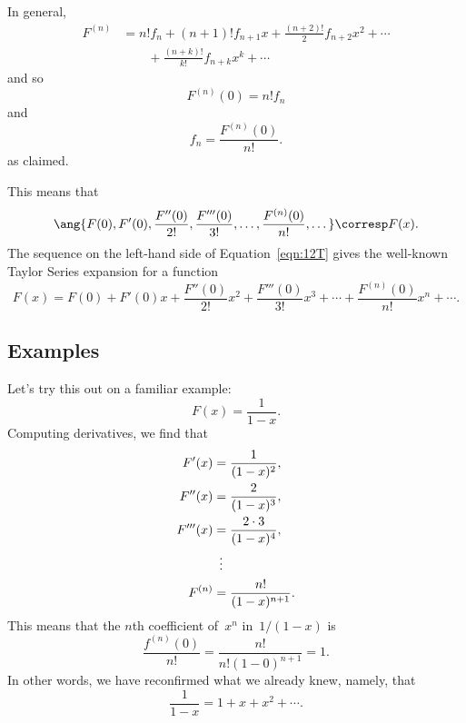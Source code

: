 In general,
\begin{align*}
F^{(n)}
    &= n! f_n
        + (n + 1)! f_{n + 1} x
        + \frac{(n + 2)!}{2} f_{n + 2} x^2
        + \cdots \\
    & \qquad {} + \frac{(n + k)!}{k!} f_{n + k} x^k
        + \cdots
\end{align*}
and so
\begin{equation*}
    F^{(n)}(0) = n! f_n
\end{equation*}
and
\begin{equation*}
    f_n = \frac{F^{(n)}(0)}{n!}.
\end{equation*}
as claimed.

This means that
\begin{equation}\label{eqn:12T}
\ang{ F(0), F'(0), \frac{F''(0)}{2!}, \frac{F'''(0)}{3!}, \dots, 
    \frac{F^{(n)}(0)}{n!}, \dots }
\corresp F(x).
\end{equation}
The sequence on the left-hand side of Equation~\ref{eqn:12T} gives the
well-known Taylor Series expansion for a function
\begin{equation*}
F(x) = F(0) + F'(0) x + \frac{F''(0)}{2!} x^2 +
    \frac{F'''(0)}{3!} x^3 + \cdots + 
    \frac{F^{(n)}(0)}{n!} x^n + \cdots.
\end{equation*}

\subsection{Examples}

Let's try this out on a familiar example:
\begin{equation*}
    F(x) = \frac{1}{1 - x}.
\end{equation*}
Computing derivatives, we find that
\begin{align*}
F'(x)   & = \frac{1}{(1 - x)^2}, \\
F''(x)  & = \frac{2}{(1 - x)^3}, \\
F'''(x) & = \frac{2 \cdot 3}{(1 - x)^4}, \\
        & \enskip\vdots \\
F^{(n)} & = \frac{n!}{(1 - x)^{n + 1}}. 
\end{align*}
This means that the $n$th coefficient of~$x^n$ in~$1/(1 - x)$ is
\begin{equation*}
\frac{f^{(n)}(0)}{n!}
    = \frac{n!}{n! (1 - 0)^{n + 1}}
    = 1.
\end{equation*}
In other words, we have reconfirmed what we already knew, namely, that
\begin{equation*}
    \frac{1}{1 - x} = 1 + x + x^2 + \cdots.
\end{equation*}

